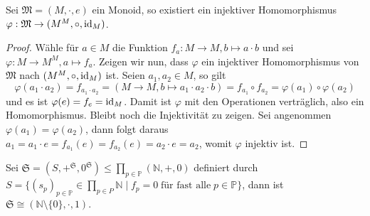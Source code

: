 \begin{theorem}\label{theorem:darstellungssatz-cayley}
    Sei $\mathfrak{M} = (M, \cdot, e)$ ein Monoid, so existiert ein injektiver Homomorphismus $\varphi: \mathfrak{M} \to (M^M, \circ, \operatorname{id}_M)$.
\end{theorem}
\begin{proof}
    Wähle für $a \in M$ die Funktion $f_a: M \to M, b \mapsto a \cdot b$ und sei $\varphi: M \to M^M, a \mapsto f_a$. Zeigen wir nun, dass $\varphi$ ein injektiver Homomorphismus von $\mathfrak{M}$ nach $(M^M, \circ, \operatorname{id}_M)$ ist. Seien $a_1, a_2 \in M$, so gilt $$\varphi(a_1 \cdot a_2) = f_{a_1 \cdot a_2} = (M \to M, b \mapsto a_1 \cdot a_2 \cdot b) = f_{a_1} \circ f_{a_2} = \varphi(a_1) \circ \varphi(a_2)$$
    und es ist $\varphi(e) = f_e = \operatorname{id}_M$. Damit ist $\varphi$ mit den Operationen verträglich, also ein Homomorphismus. Bleibt noch die Injektivität zu zeigen. Sei angenommen $\varphi(a_1) = \varphi(a_2)$, dann folgt daraus $a_1 = a_1 \cdot e = f_{a_1}(e) = f_{a_2}(e) = a_2 \cdot e = a_2$, womit $\varphi$ injektiv ist.
\end{proof}

\begin{theorem}\label{theorem:fundamentalsatz-der-arithmetik}
    Sei $\mathfrak{S} = (S, +^{\mathfrak{S}}, 0^{\mathfrak{S}}) \le \prod_{p \in \mathbb{P}} (\mathbb{N}, +, 0)$ definiert durch $S = \{(s_p)_{p \in \mathbb{P}} \in \prod_{p \in P} \mathbb{N} \mid f_p = 0 \;\text{für fast alle}\; p \in \mathbb{P}\}$, dann ist $\mathfrak{S} \cong (\mathbb{N}\setminus\{0\}, \cdot, 1)$.
\end{theorem}

